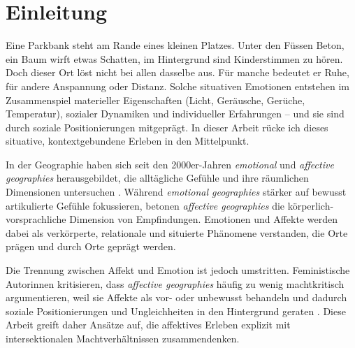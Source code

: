 \chapter{Einleitung} \label{sec:einleitung}

Eine Parkbank steht am Rande eines kleinen Platzes. Unter den Füssen Beton, ein Baum wirft etwas Schatten, im Hintergrund sind Kinderstimmen zu hören. Doch dieser Ort löst nicht bei allen dasselbe aus. Für manche bedeutet er Ruhe, für andere Anspannung oder Distanz. Solche situativen Emotionen entstehen im Zusammenspiel materieller Eigenschaften (Licht, Geräusche, Gerüche, Temperatur), sozialer Dynamiken und individueller Erfahrungen -- und sie sind durch soziale Positionierungen mitgeprägt. In dieser Arbeit rücke ich dieses situative, kontextgebundene Erleben in den Mittelpunkt.

In der Geographie haben sich seit den 2000er-Jahren \emph{emotional} und \emph{affective geographies} herausgebildet, die alltägliche Gefühle und ihre räumlichen Dimensionen untersuchen \parencite{hoSocialGeographyIII2024}. Während \emph{emotional geographies} stärker auf bewusst artikulierte Gefühle fokussieren, betonen \emph{affective geographies} die körperlich-vorsprachliche Dimension von Empfindungen. Emotionen und Affekte werden dabei als verkörperte, relationale und situierte Phänomene verstanden, die Orte prägen und durch Orte geprägt werden. 

Die Trennung zwischen Affekt und Emotion ist jedoch umstritten. Feministische Autor\genderstern innen kritisieren, dass \emph{affective geographies} häufig zu wenig machtkritisch argumentieren, weil sie Affekte als vor- oder unbewusst behandeln und dadurch soziale Positionierungen und Ungleichheiten in den Hintergrund geraten \parencite{bondiIntroductionGeographysEmotional2006,rodo-de-zarateIntersectionalitySpatialityEmotions2023}. Diese Arbeit greift daher Ansätze auf, die affektives Erleben explizit mit intersektionalen Machtverhältnissen zusammendenken.

